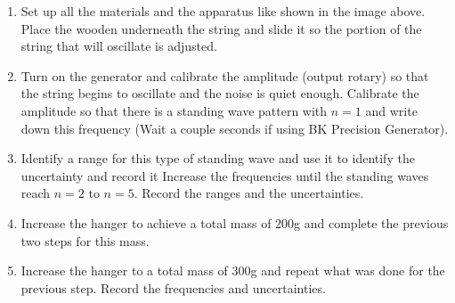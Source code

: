 

{}

\begin{enumerate}
	\item {Set up all the materials and the apparatus like shown in the image above. Place the wooden underneath the string and slide it so the portion of the string that will oscillate is adjusted.}
	\item {Turn on the generator and calibrate the amplitude (output rotary) so that the string begins to oscillate and the noise is quiet enough. Calibrate the amplitude so that there is a standing wave pattern with $n=1$ and write down this frequency (Wait a couple seconds if using BK Precision Generator).}
	\item {Identify a range for this type of standing wave and use it to identify the uncertainty and record it
Increase the frequencies until the standing waves reach $n=2\text{ to }n=5$. Record the ranges and the uncertainties.}
	\item {Increase the hanger to achieve a total mass of 200g and complete the previous two steps for this mass.}
	\item {Increase the hanger to a total mass of 300g and repeat what was done for the previous step. Record the frequencies and uncertainties.}
\end{enumerate}


{}



